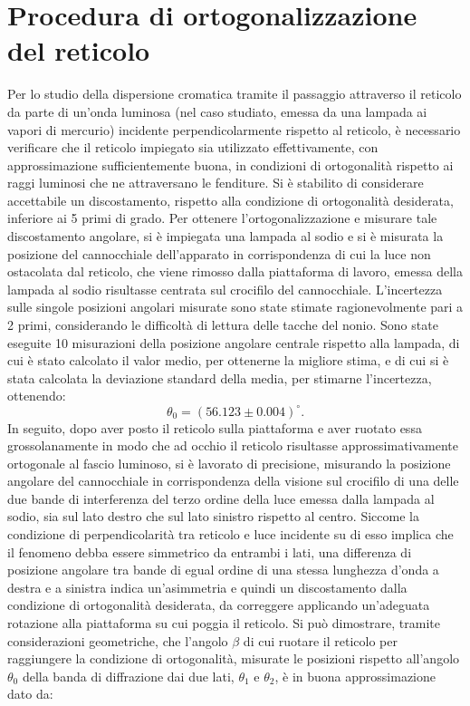 \documentclass[a4paper,12pt]{article}
\begin{document}
\section{Procedura di ortogonalizzazione del reticolo }
Per lo studio della dispersione cromatica tramite il passaggio attraverso il reticolo da parte di un’onda luminosa (nel caso studiato, emessa da una lampada ai vapori di mercurio) incidente perpendicolarmente rispetto al reticolo, è necessario verificare che il reticolo impiegato sia utilizzato effettivamente, con approssimazione sufficientemente buona, in condizioni di ortogonalità rispetto ai raggi luminosi che ne attraversano le fenditure. Si è stabilito di considerare accettabile un discostamento, rispetto alla condizione di ortogonalità desiderata, inferiore ai 5 primi di grado. Per ottenere l’ortogonalizzazione e misurare tale discostamento angolare, si è impiegata una lampada al sodio e si è misurata la posizione del cannocchiale dell’apparato in corrispondenza di cui la luce non ostacolata dal reticolo, che viene rimosso dalla piattaforma di lavoro, emessa della lampada al sodio risultasse centrata sul crocifilo del cannocchiale. L’incertezza sulle singole posizioni angolari misurate sono state stimate ragionevolmente pari a 2 primi, considerando le difficoltà di lettura delle tacche del nonio. Sono state eseguite 10 misurazioni della posizione angolare centrale rispetto alla lampada, di cui è stato calcolato il valor medio, per ottenerne la migliore stima, e di cui si è stata calcolata la deviazione standard della media, per stimarne l’incertezza, ottenendo: 
\[
\theta_0 = (56.123 \pm 0.004)^\circ.
\]
In seguito, dopo aver posto il reticolo sulla piattaforma e aver ruotato essa grossolanamente in modo che ad occhio il reticolo risultasse approssimativamente ortogonale al fascio luminoso, si è lavorato di precisione, misurando la posizione angolare del cannocchiale in corrispondenza della visione sul crocifilo di una delle due bande di interferenza del terzo ordine della luce emessa dalla lampada al sodio, sia sul lato destro che sul lato sinistro rispetto al centro. Siccome la condizione di perpendicolarità tra reticolo e luce incidente su di esso implica che il fenomeno debba essere simmetrico da entrambi i lati, una differenza di posizione angolare tra bande di egual ordine di una stessa lunghezza d’onda a destra e a sinistra indica un’asimmetria e quindi un discostamento dalla condizione di ortogonalità desiderata, da correggere applicando un’adeguata rotazione alla piattaforma su cui poggia il reticolo. 
Si può dimostrare, tramite considerazioni geometriche, che l’angolo \( \beta \) di cui ruotare il reticolo per raggiungere la condizione di ortogonalità, misurate le posizioni rispetto all’angolo \( \theta_0 \) della banda di diffrazione dai due lati, \( \theta_1 \) e \( \theta_2 \), è in buona approssimazione dato da:
\end{document}
